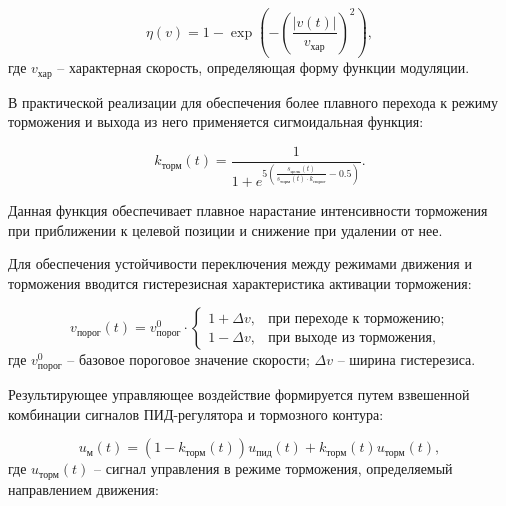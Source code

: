 \begin{equation}\label{eq:modulation_function}
	\eta(v) = 1 - \exp\left(-\left(\frac{|v(t)|}{v_{\text{хар}}}\right)^2\right),
\end{equation}
где $v_{\text{хар}}$ -- характерная скорость, определяющая форму функции модуляции.

В практической реализации для обеспечения более плавного перехода к режиму торможения и выхода из него применяется сигмоидальная функция:

\begin{equation}\label{eq:sigmoid_braking}
	k_{\text{торм}}(t) = \frac{1}{1 + e^{5\left(\frac{s_{\text{цель}}(t)}{s_{\text{торм}}(t) \cdot k_{\text{порог}}} - 0.5\right)}}.
\end{equation}

Данная функция обеспечивает плавное нарастание интенсивности торможения при приближении к целевой позиции и снижение при удалении от нее.

Для обеспечения устойчивости переключения между режимами движения и торможения вводится гистерезисная характеристика активации торможения:

\begin{equation}\label{eq:hysteresis}
	v_{\text{порог}}(t) = v_{\text{порог}}^0 \cdot \begin{cases}
		1 + \Delta v, & \text{при переходе к торможению}; \\
		1 - \Delta v, & \text{при выходе из торможения},
	\end{cases}
\end{equation}
где $v_{\text{порог}}^0$ -- базовое пороговое значение скорости;
$\Delta v$ -- ширина гистерезиса.

Результирующее управляющее воздействие формируется путем
взвешенной комбинации сигналов ПИД-регулятора и тормозного контура:

\begin{equation}\label{eq:combined_control}
	u_{\text{м}}(t) = (1 - k_{\text{торм}}(t))u_{\text{пид}}(t) + k_{\text{торм}}(t)u_{\text{торм}}(t),
\end{equation}
где $u_{\text{торм}}(t)$ -- сигнал управления в режиме торможения, определяемый направлением движения:

